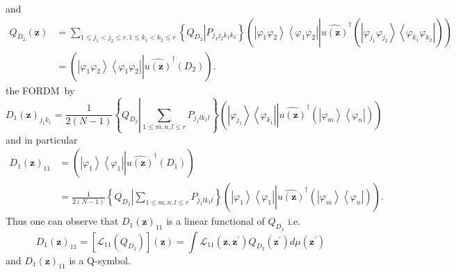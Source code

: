 \documentclass[aps,preprint]{revtex4}%
\begin{document}
and
\begin{align}
Q_{D_{2}}\left(  \mathbf{z}\right)   &  =\sum_{1\leq j_{1}<j_{2}\leq r,1\leq
k_{1}<k_{2}\leq r}\left\{  \left.  \overset{}{Q_{D_{2}}}\right\vert
\overset{}{P_{j_{1}j_{2}k_{1}k_{2}}}\right\}  \left(  \left\vert \varphi
_{1}\varphi_{2}\right\rangle \left\langle \varphi_{1}\varphi_{2}\right\vert
\left\vert \widehat{u\left(  \mathbf{z}\right)  }^{\dagger}\left(
\overset{}{\left\vert \varphi_{j_{1}}\varphi_{j_{2}}\right\rangle \left\langle
\varphi_{k_{1}}\varphi_{k_{2}}\right\vert }\right)  \right.  \right)
\nonumber\\
&  =\left(  \left\vert \varphi_{1}\varphi_{2}\right\rangle \left\langle
\varphi_{1}\varphi_{2}\right\vert \left\vert \widehat{u\left(  \mathbf{z}%
\right)  }^{\dagger}\left(  D_{2}\right)  \right.  \right)  .
\end{align}
the FORDM\ by
\begin{equation}
D_{1}\left(  \mathbf{z}\right)  _{j_{1}k_{1}}=\frac{1}{2\left(  N-1\right)
}\left\{  Q_{D_{2}}\left\vert \sum_{1\leq m,n,l\leq r}P_{j_{1}lk_{1}l}\right.
\right\}  \left(  \left\vert \varphi_{j_{1}}\right\rangle \left\langle
\varphi_{k_{1}}\right\vert \left\vert \widehat{u\left(  \mathbf{z}\right)
}^{\dagger}\left(  \overset{}{\left\vert \varphi_{m}\right\rangle \left\langle
\varphi_{n}\right\vert }\right)  \right.  \right)
\end{equation}
and in particular
\begin{align}
D_{1}\left(  \mathbf{z}\right)  _{11}  &  =\left(  \left\vert \varphi
_{1}\right\rangle \left\langle \varphi_{1}\right\vert \left\vert
\widehat{u\left(  \mathbf{z}\right)  }^{\dagger}\left(  D_{1}\right)  \right.
\right) \nonumber\\
&  =\frac{1}{2\left(  N-1\right)  }\left\{  Q_{D_{2}}\left\vert \sum_{1\leq
m,n,l\leq r}P_{j_{1}lk_{1}l}\right.  \right\}  \left(  \left\vert \varphi
_{1}\right\rangle \left\langle \varphi_{1}\right\vert \left\vert
\widehat{u\left(  \mathbf{z}\right)  }^{\dagger}\left(  \overset{}{\left\vert
\varphi_{m}\right\rangle \left\langle \varphi_{n}\right\vert }\right)
\right.  \right)  .
\end{align}
Thus one can observe that $D_{1}\left(  \mathbf{z}\right)  _{11}$ is a linear
functional of $Q_{D_{2}}$ i.e.
\begin{equation}
D_{1}\left(  \mathbf{z}\right)  _{11}=\left[  \mathcal{L}_{11}\left(
Q_{D_{2}}\right)  \right]  \left(  \mathbf{z}\right)  =\int\mathcal{L}%
_{11}\left(  \mathbf{z,z}^{\prime}\right)  Q_{D_{2}}\left(  \mathbf{z}%
^{\prime}\right)  d\mu\left(  \mathbf{z}^{\prime}\right)
\end{equation}
and $D_{1}\left(  \mathbf{z}\right)  _{11}$ is a Q-symbol$.$
\end{document}
